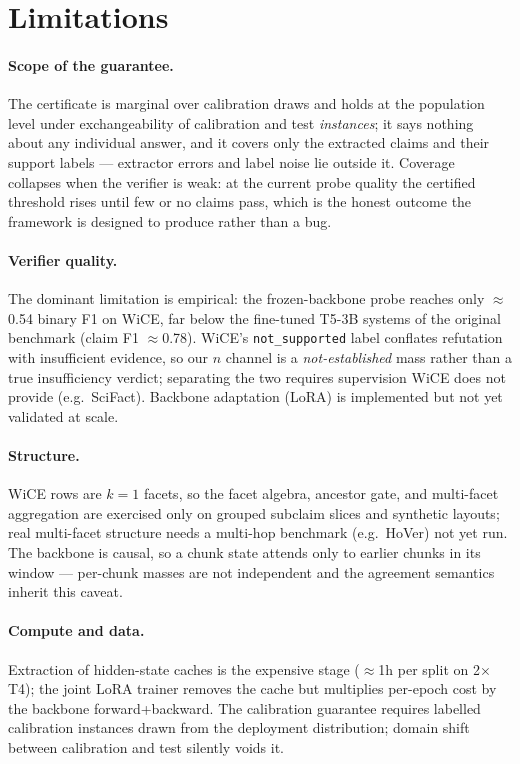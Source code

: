 \documentclass{article}
\begin{document}
\section{Limitations}
\label{sec:limitations}

\paragraph{Scope of the guarantee.}
The certificate is marginal over calibration draws and holds at the
population level under exchangeability of calibration and test
\emph{instances}; it says nothing about any individual answer, and it
covers only the extracted claims and their support labels --- extractor
errors and label noise lie outside it. Coverage collapses when the
verifier is weak: at the current probe quality the certified threshold
rises until few or no claims pass, which is the honest outcome the
framework is designed to produce rather than a bug.

\paragraph{Verifier quality.}
The dominant limitation is empirical: the frozen-backbone probe reaches
only $\approx$0.54 binary F1 on WiCE, far below the fine-tuned T5-3B
systems of the original benchmark (claim F1 $\approx$0.78). WiCE's
\texttt{not\_supported} label conflates refutation with insufficient
evidence, so our $n$ channel is a \emph{not-established} mass rather
than a true insufficiency verdict; separating the two requires
supervision WiCE does not provide (e.g.\ SciFact). Backbone adaptation
(LoRA) is implemented but not yet validated at scale.

\paragraph{Structure.}
WiCE rows are $k{=}1$ facets, so the facet algebra, ancestor gate, and
multi-facet aggregation are exercised only on grouped subclaim slices
and synthetic layouts; real multi-facet structure needs a multi-hop
benchmark (e.g.\ HoVer) not yet run. The backbone is causal, so a chunk
state attends only to earlier chunks in its window --- per-chunk masses
are not independent and the agreement semantics inherit this caveat.

\paragraph{Compute and data.}
Extraction of hidden-state caches is the expensive stage ($\approx$1h
per split on 2$\times$T4); the joint LoRA trainer removes the cache but
multiplies per-epoch cost by the backbone forward+backward. The
calibration guarantee requires labelled calibration instances drawn
from the deployment distribution; domain shift between calibration and
test silently voids it.
\end{document}
